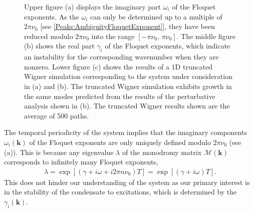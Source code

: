 \begin{figure}
{        Upper figure (a) displays the imaginary part $\omega_i$ of the Floquet exponents. As the $\omega_i$ can only be determined up to a multiple of $2\pi\nu_0$ [see \eqref{Peaks:AmbiguityFloquetExponent}], they have been reduced modulo $2\pi\nu_0$ into the range $\left[-\pi\nu_0,\, \pi\nu_0\right]$.
        The middle figure (b) shows the real part $\gamma_i$ of the Floquet exponents, which indicate an instability for the corresponding wavenumber when they are nonzero.
        Lower figure (c) shows the results of a 1D truncated Wigner simulation corresponding to the system under consideration in (a) and (b). The truncated Wigner simulation exhibits growth in the same modes predicted from the results of the perturbative analysis shown in (b). The truncated Wigner results shown are the average of 500 paths.}
\end{figure}

The temporal periodicity of the system implies that the imaginary components $\omega_i(\bm{k})$ of the Floquet exponents are only uniquely defined modulo $2\pi \nu_0$ (see (a)). This is because any eigenvalue $\lambda$ of the monodromy matrix $\mathcal{M}(\bm{k})$ corresponds to infinitely many Floquet exponents,
\begin{align}
    \label{Peaks:AmbiguityFloquetExponent}
    \lambda = \exp\left[\left(\gamma + i\omega + i 2 \pi n \nu_0\right)T\right] = \exp\left[\left(\gamma + i \omega\right)T\right].
\end{align}
This does not hinder our understanding of the system as our primary interest is in the stability of the condensate to excitations, which is determined by the $\gamma_i(\bm{k})$.

